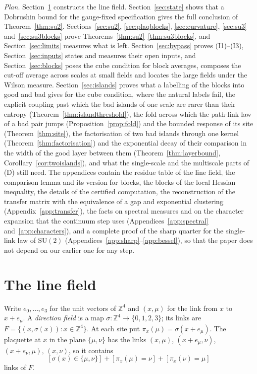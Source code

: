 \documentclass[11pt]{amsart}
\theoremstyle{definition}
\theoremstyle{remark}
\numberwithin{equation}{section}
\newcommand{\Z}{\mathbb{Z}}
\newcommand{\SU}{\mathrm{SU}}
\begin{document}
\emph{Plan.} Section~\ref{sec:linefield} constructs the line field.
Section~\ref{sec:state} shows that a Dobrushin bound for the gauge-fixed
specification gives the full conclusion of Theorem~\ref{thm:su2}.
Sections~\ref{sec:su2}, \ref{sec:plaqblocks}, \ref{sec:curvature},
\ref{sec:su3} and~\ref{sec:su3blocks} prove Theorems~\ref{thm:su2}--\ref{thm:su3blocks}, and
Section~\ref{sec:limits} measures what is left. Section~\ref{sec:bypass} proves
(I1)--(I3), Section~\ref{sec:inputs} states and measures their open inputs,
and Section~\ref{sec:blocks} poses the cube condition for block averages, composes the cut-off average
across scales at small fields and locates the large fields under the
Wilson measure. Section~\ref{sec:islands} proves what a labelling of the
blocks into good and bad gives for the cube condition, where the natural
labels fail, the explicit coupling past which the bad islands of one
scale are rarer than their entropy (Theorem~\ref{thm:islandthreshold}),
the fold across which the path-link law of a bad pair jumps (Proposition~\ref{prop:fold}) and the bounded response of its site (Theorem~\ref{thm:site}), the factorisation of two bad islands through one kernel (Theorem~\ref{thm:factorisation}) and the exponential decay of their comparison in the width of the good layer between them (Theorem~\ref{thm:layerbound}, Corollary~\ref{cor:twoislands}), and what the single-scale and the multiscale parts of (D) still need. The appendices contain the
residue table of the line field, the comparison lemma and its version for
blocks, the blocks of the local Hessian inequality, the details of the
certified computation, the reconstruction of the transfer matrix with the
equivalence of a gap and exponential clustering
(Appendix~\ref{app:transfer}), the facts on spectral measures and on the
character expansion that the continuum step uses
(Appendices~\ref{app:spectral} and~\ref{app:characters}), and a complete
proof of the sharp quarter for the single-link law of $\SU(2)$
(Appendices~\ref{app:sharp}--\ref{app:bessel}), so that the paper does not
depend on our earlier one for any step.

\section{The line field}\label{sec:linefield}

Write $e_0,\dots,e_3$ for the unit vectors of $\Z^4$ and $(x,\mu)$ for the
link from $x$ to $x+e_\mu$. A \emph{direction field} is a map
$\sigma:\Z^4\to\{0,1,2,3\}$; its links are $F=\{(x,\sigma(x)):x\in\Z^4\}$. At
each site put $\pi_x(\mu)=\sigma(x+e_\mu)$. The plaquette at $x$ in the plane
$\{\mu,\nu\}$ has the links $(x,\mu)$, $(x+e_\mu,\nu)$, $(x+e_\nu,\mu)$,
$(x,\nu)$, so it contains
\begin{equation}\label{eq:count}
[\sigma(x)\in\{\mu,\nu\}]+[\pi_x(\mu)=\nu]+[\pi_x(\nu)=\mu]
\end{equation}
links of $F$.
\end{document}
